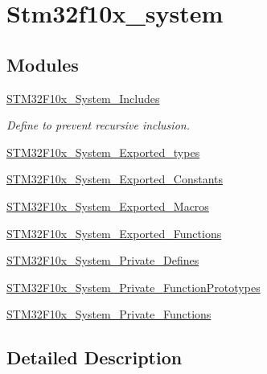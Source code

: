 \hypertarget{group__stm32f10x__system}{}\section{Stm32f10x\+\_\+system}
\label{group__stm32f10x__system}
\subsection*{Modules}
\begin{DoxyCompactItemize}
\item 
\mbox{\hyperlink{group___s_t_m32_f10x___system___includes}{S\+T\+M32\+F10x\+\_\+\+System\+\_\+\+Includes}}
\begin{DoxyCompactList}\small\item\em Define to prevent recursive inclusion. \end{DoxyCompactList}\item 
\mbox{\hyperlink{group___s_t_m32_f10x___system___exported__types}{S\+T\+M32\+F10x\+\_\+\+System\+\_\+\+Exported\+\_\+types}}
\item 
\mbox{\hyperlink{group___s_t_m32_f10x___system___exported___constants}{S\+T\+M32\+F10x\+\_\+\+System\+\_\+\+Exported\+\_\+\+Constants}}
\item 
\mbox{\hyperlink{group___s_t_m32_f10x___system___exported___macros}{S\+T\+M32\+F10x\+\_\+\+System\+\_\+\+Exported\+\_\+\+Macros}}
\item 
\mbox{\hyperlink{group___s_t_m32_f10x___system___exported___functions}{S\+T\+M32\+F10x\+\_\+\+System\+\_\+\+Exported\+\_\+\+Functions}}
\item 
\mbox{\hyperlink{group___s_t_m32_f10x___system___private___defines}{S\+T\+M32\+F10x\+\_\+\+System\+\_\+\+Private\+\_\+\+Defines}}
\item 
\mbox{\hyperlink{group___s_t_m32_f10x___system___private___function_prototypes}{S\+T\+M32\+F10x\+\_\+\+System\+\_\+\+Private\+\_\+\+Function\+Prototypes}}
\item 
\mbox{\hyperlink{group___s_t_m32_f10x___system___private___functions}{S\+T\+M32\+F10x\+\_\+\+System\+\_\+\+Private\+\_\+\+Functions}}
\end{DoxyCompactItemize}


\subsection{Detailed Description}
